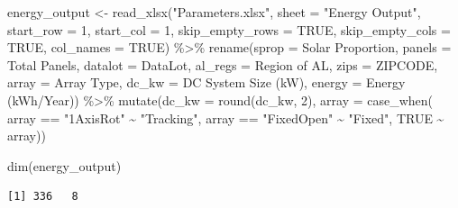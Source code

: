 \documentclass[
  letterpaper,
  DIV=11,
  numbers=noendperiod]{scrartcl}
\newenvironment{Shaded}{\begin{snugshade}}{\end{snugshade}}
\newcommand{\AttributeTok}[1]{\textcolor[rgb]{0.40,0.45,0.13}{#1}}
\newcommand{\ConstantTok}[1]{\textcolor[rgb]{0.56,0.35,0.01}{#1}}
\newcommand{\DecValTok}[1]{\textcolor[rgb]{0.68,0.00,0.00}{#1}}
\newcommand{\FunctionTok}[1]{\textcolor[rgb]{0.28,0.35,0.67}{#1}}
\newcommand{\NormalTok}[1]{\textcolor[rgb]{0.00,0.23,0.31}{#1}}
\newcommand{\OtherTok}[1]{\textcolor[rgb]{0.00,0.23,0.31}{#1}}
\newcommand{\SpecialCharTok}[1]{\textcolor[rgb]{0.37,0.37,0.37}{#1}}
\newcommand{\StringTok}[1]{\textcolor[rgb]{0.13,0.47,0.30}{#1}}
\begin{document}
\begin{Shaded}
\begin{Highlighting}[]
\NormalTok{energy\_output }\OtherTok{\textless{}{-}} \FunctionTok{read\_xlsx}\NormalTok{(}\StringTok{"Parameters.xlsx"}\NormalTok{, }
                           \AttributeTok{sheet =} \StringTok{"Energy Output"}\NormalTok{,}
                           \AttributeTok{start\_row =} \DecValTok{1}\NormalTok{,}
                           \AttributeTok{start\_col =} \DecValTok{1}\NormalTok{,}
                           \AttributeTok{skip\_empty\_rows =} \ConstantTok{TRUE}\NormalTok{,}
                           \AttributeTok{skip\_empty\_cols =} \ConstantTok{TRUE}\NormalTok{,}
                           \AttributeTok{col\_names =} \ConstantTok{TRUE}\NormalTok{) }\SpecialCharTok{\%\textgreater{}\%}
  \FunctionTok{rename}\NormalTok{(}\AttributeTok{sprop =} \StringTok{\textasciigrave{}}\AttributeTok{Solar Proportion}\StringTok{\textasciigrave{}}\NormalTok{,}
         \AttributeTok{panels =} \StringTok{\textasciigrave{}}\AttributeTok{Total Panels}\StringTok{\textasciigrave{}}\NormalTok{,}
         \AttributeTok{datalot =}\NormalTok{ DataLot,}
         \AttributeTok{al\_regs =} \StringTok{\textasciigrave{}}\AttributeTok{Region of AL}\StringTok{\textasciigrave{}}\NormalTok{,}
         \AttributeTok{zips =}\NormalTok{ ZIPCODE,}
         \AttributeTok{array =} \StringTok{\textasciigrave{}}\AttributeTok{Array Type}\StringTok{\textasciigrave{}}\NormalTok{,}
         \AttributeTok{dc\_kw =} \StringTok{\textasciigrave{}}\AttributeTok{DC System Size (kW)}\StringTok{\textasciigrave{}}\NormalTok{,}
         \AttributeTok{energy =} \StringTok{\textasciigrave{}}\AttributeTok{Energy (kWh/Year)}\StringTok{\textasciigrave{}}\NormalTok{) }\SpecialCharTok{\%\textgreater{}\%}
  \FunctionTok{mutate}\NormalTok{(}\AttributeTok{dc\_kw =} \FunctionTok{round}\NormalTok{(dc\_kw, }\DecValTok{2}\NormalTok{),}
         \AttributeTok{array =} \FunctionTok{case\_when}\NormalTok{(}
\NormalTok{           array }\SpecialCharTok{==} \StringTok{"1AxisRot"} \SpecialCharTok{\textasciitilde{}} \StringTok{"Tracking"}\NormalTok{,}
\NormalTok{           array }\SpecialCharTok{==} \StringTok{"FixedOpen"} \SpecialCharTok{\textasciitilde{}} \StringTok{"Fixed"}\NormalTok{,}
           \ConstantTok{TRUE} \SpecialCharTok{\textasciitilde{}}\NormalTok{ array))}

\FunctionTok{dim}\NormalTok{(energy\_output)}
\end{Highlighting}
\end{Shaded}

\begin{verbatim}
[1] 336   8
\end{verbatim}
\end{document}

